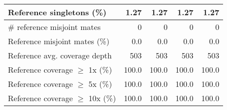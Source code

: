 \documentclass[12pt,a4paper]{article}
\begin{document}
\begin{table}[ht]
\begin{center}
\begin{tabular}{|l*{4}{|r}|}
Reference singletons (\%) & 1.27 & 1.27 & 1.27 & 1.27 \\ \hline
\# reference misjoint mates & 0 & 0 & 0 & 0 \\ \hline
Reference misjoint mates (\%) & 0.0 & 0.0 & 0.0 & 0.0 \\ \hline
Reference avg. coverage depth & 503 & 503 & 503 & 503 \\ \hline
Reference coverage $\geq$ 1x (\%) & 100.0 & 100.0 & 100.0 & 100.0 \\ \hline
Reference coverage $\geq$ 5x (\%) & 100.0 & 100.0 & 100.0 & 100.0 \\ \hline
Reference coverage $\geq$ 10x (\%) & 100.0 & 100.0 & 100.0 & 100.0 \\ \hline
\end{tabular}
\end{center}
\end{table}
\end{document}
